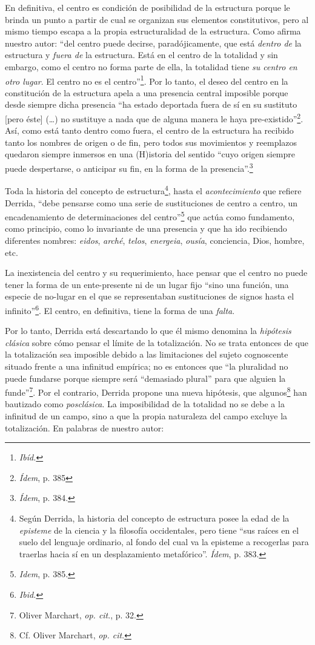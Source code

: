 En definitiva, el centro es condición de posibilidad de la estructura
porque le brinda un punto a partir de cual se organizan sus elementos
constitutivos, pero al mismo tiempo escapa a la propia estructuralidad
de la estructura. Como afirma nuestro autor: \enquote{del centro puede decirse,
paradójicamente, que está \emph{dentro de} la estructura y \emph{fuera
de} la estructura. Está en el centro de la totalidad y sin embargo, como
el centro no forma parte de ella, la totalidad tiene \emph{su centro en
otro lugar}. El centro no es el centro}\footnote{\emph{Ibíd.}}. Por lo
tanto, el deseo del centro en la constitución de la estructura apela a
una presencia central imposible porque desde siempre dicha presencia \enquote{ha
estado deportada fuera de sí en su sustituto {[}pero éste{]}
(\dots) no sustituye a nada que de alguna manera le haya
pre-existido}\footnote{\emph{Ídem}, p. 385}. Así, como está tanto dentro
como fuera, el centro de la estructura ha recibido tanto los nombres de
origen o de fin, pero todos sus movimientos y reemplazos quedaron
siempre inmersos en una (H)istoria del sentido \enquote{cuyo origen siempre
puede despertarse, o anticipar su fin, en la forma de la
presencia}.\footnote{\emph{Ídem}, p. 384.}

Toda la historia del concepto de estructura\footnote{Según Derrida, la
  historia del concepto de estructura posee la edad de la
  \emph{episteme} de la ciencia y la filosofía occidentales, pero tiene
  \enquote{sus raíces en el suelo del lenguaje ordinario, al fondo del cual va
  la episteme a recogerlas para traerlas hacia sí en un desplazamiento
  metafórico}. \emph{Ídem}, p. 383.}, hasta el \emph{acontecimiento} que
refiere Derrida, \enquote{debe pensarse como una serie de sustituciones de
centro a centro, un encadenamiento de determinaciones del
centro}\footnote{\emph{Idem}, p. 385.} que actúa como fundamento, como
principio, como lo invariante de una presencia y que ha ido recibiendo
diferentes nombres: \emph{eidos}, \emph{arché}, \emph{telos},
\emph{energeia}, \emph{ousía}, conciencia, Dios, hombre, etc.

La inexistencia del centro y su requerimiento, hace pensar que el centro
no puede tener la forma de un ente-presente ni de un lugar fijo \enquote{sino
una función, una especie de no-lugar en el que se representaban
sustituciones de signos hasta el infinito}\footnote{\emph{Ibid.}}. El
centro, en definitiva, tiene la forma de una \emph{falta}.

Por lo tanto, Derrida está descartando lo que él mismo denomina la
\emph{hipótesis clásica} sobre cómo pensar el límite de la totalización.
No se trata entonces de que la totalización sea imposible debido a las
limitaciones del sujeto cognoscente situado frente a una infinitud
empírica; no es entonces que \enquote{la pluralidad no puede fundarse porque
siempre será ``demasiado plural'' para que alguien la funde}\footnote{Oliver
  Marchart, \emph{op. cit}., p. 32.}. Por el contrario, Derrida propone
una nueva hipótesis, que algunos\footnote{Cf. Oliver Marchart, \emph{op.
  cit}.} han bautizado como \emph{posclásica}. La imposibilidad de la
totalidad no se debe a la infinitud de un campo, sino a que la propia
naturaleza del campo excluye la totalización. En palabras de nuestro
autor:

